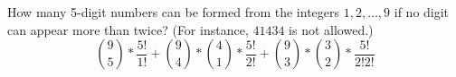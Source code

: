 \item How many 5-digit numbers can be formed from the integers $1,2,\dots,9$ if no digit can appear more than twice? (For instance, $41434$ is not allowed.)
\[ \binom{9}{5} * \frac{5!}{1!} + \binom{9}{4} * \binom{4}{1} * \frac{5!}{2!} + \binom{9}{3} * \binom{3}{2} * \frac{5!}{2! 2!} \]